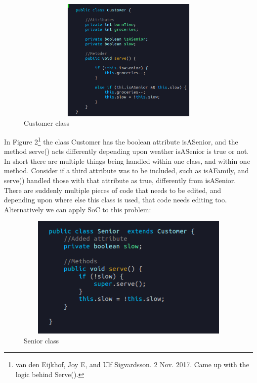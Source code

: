 \documentclass[11pt,a4paper]{article}
\begin{document}
\begin{flushleft}
\begin{figure}[h!]
  \includegraphics[width=18cm,height=6cm,keepaspectratio,]{Images/FulSenior.png}
  \caption{Customer class}
  \label{Figure 1.2}
\end{figure}

In Figure 2\footnote{van den Eijkhof, Joy E, and Ulf Sigvardsson. 2 Nov. 2017. Came up with the logic behind Serve().} the class Customer has the boolean attribute isASenior, and the method serve() acts differently depending upon weather isASenior is true or not. In short there are multiple things being handled within one class, and within one method. Consider if a third attribute was to be included, such as isAFamily, and serve() handled those with that attribute as true, differently from isASenior. There are suddenly multiple pieces of code that needs to be edited, and depending upon where else this class is used, that code needs editing too. Alternatively we can apply SoC to this problem:\linebreak \linebreak \linebreak \linebreak \linebreak \linebreak \linebreak \linebreak \linebreak \linebreak \linebreak \linebreak 

\begin{figure}[h!]
  \includegraphics[width=15cm,height=6cm,keepaspectratio,]{Images/Senior}
  \caption{Senior class}
  \label{Figure 1.3}
\end{figure}



\end{flushleft}
\end{document}
